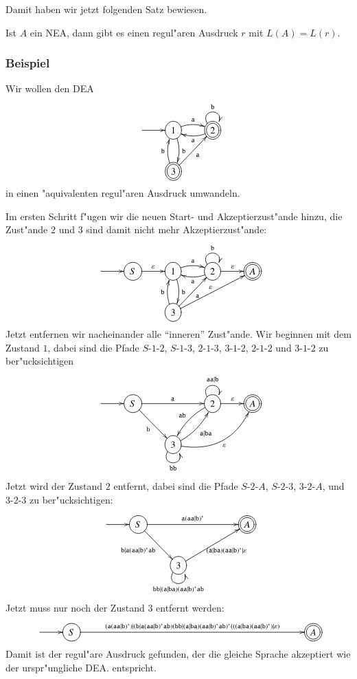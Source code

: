 Damit  haben wir jetzt folgenden Satz bewiesen.
\begin{satz}
Ist $A$ ein NEA, dann gibt es einen regul"aren Ausdruck $r$ mit
$L(A)=L(r)$.
\end{satz}

\subsubsection{Beispiel}
Wir wollen den DEA
\[
\entrymodifiers={++[o][F]}
\xymatrix{
*+\txt{}\ar[r]
	&{1}\ar@/^/[r]^{\tt a} \ar@/^/[d]^{\tt b}
		&*++[o][F=]{2} \ar@(ul,ur)^{\tt b} \ar@/^/[l]^{\tt a}
\\
*+\txt{}
	&*++[o][F=]{3} \ar[ur]_{\tt a} \ar@/^/[u]^{\tt b}
}
\]
in einen "aquivalenten regul"aren Ausdruck umwandeln.

Im ersten Schritt f"ugen wir die neuen Start- und Akzeptierzust"ande 
hinzu, die Zust"ande $2$ und $3$ sind damit nicht mehr Akzeptierzust"ande:
\[
\entrymodifiers={++[o][F]}
\xymatrix{
*+\txt{}\ar[r]
	&S\ar[r]^{\varepsilon}
		&{1}\ar@/^/[r]^{\tt a} \ar@/^/[d]^{\tt b}
			&{2} \ar@(ul,ur)^{\tt b} \ar@/^/[l]^{\tt a}\ar[r]^{\varepsilon}
				&*++[o][F=]{A}
\\
*+\txt{}
	&*+\txt{}
		&{3} \ar[ur]_{\tt a} \ar@/^/[u]^{\tt b} \ar[urr]^{\varepsilon}
}
\]
Jetzt entfernen wir nacheinander alle ``inneren'' Zust"ande. Wir beginnen mit
dem Zustand $1$, dabei sind die Pfade
$S$-$1$-$2$,
$S$-$1$-$3$,
$2$-$1$-$3$,
$3$-$1$-$2$,
$2$-$1$-$2$
und $3$-$1$-$2$
zu ber"ucksichtigen
\[
\entrymodifiers={++[o][F]}
\xymatrix{
*+\txt{}\ar[r]
	&S\ar[rr]^{\tt a} \ar[dr]_{\tt b}
		&*+\txt{}
			&{2} \ar@(ul,ur)^{\tt aa|b} \ar@/_/[dl]_{\tt ab} \ar[r]^{\varepsilon}
				&*++[o][F=]{A}
\\
*+\txt{}
	&*+\txt{}
		&{3} \ar@/_/[ur]_{\tt a|ba} \ar@/_20pt/[urr]_{\varepsilon} \ar@(dl,dr)_{\tt bb}
}
\]
Jetzt wird der Zustand $2$ entfernt, dabei sind die Pfade 
$S$-$2$-$A$,
$S$-$2$-$3$,
$3$-$2$-$A$,
und
$3$-$2$-$3$
zu ber"ucksichtigen:
\[
\entrymodifiers={++[o][F]}
\xymatrix{
*+\txt{}\ar[r]
	&S\ar[rrr]^{\tt a(aa|b)^*} \ar[dr]_{\tt b|a(aa|b)^*ab}
		&*+\txt{}
			&*+\txt{}
				&*++[o][F=]{A}
\\
*+\txt{}
	&*+\txt{}
		&{3} \ar[urr]_{{\tt (a|ba)(aa|b)^*}|\varepsilon} \ar@(dl,dr)_{{\tt bb|(a|ba)(aa|b)^*ab}}
}
\]
Jetzt muss nur noch der Zustand $3$ entfernt werden:
\[
\entrymodifiers={++[o][F]}
\xymatrix{
*+\txt{}\ar[r]
	&S\ar[rrrrrrrr]^{\tt (a(aa|b)^*)|(b|a(aa|b)^*ab)(bb|(a|ba)(aa|b)^*ab)^*(((a|ba)(aa|b)^*)|\varepsilon)}
		&*+\txt{}
			&*+\txt{}
			&*+\txt{}
			&*+\txt{}
			&*+\txt{}
			&*+\txt{}
			&*+\txt{}
				&*++[o][F=]{A}
}
\]
Damit ist der regul"are Ausdruck gefunden, der die gleiche Sprache
akzeptiert wie der urspr"ungliche DEA.
entspricht.

